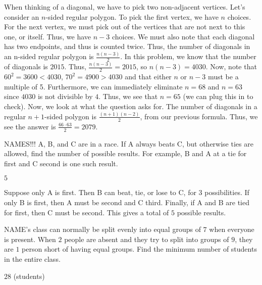 \documentclass[11pt]{article}
\begin{document}
\begin{solution}
When thinking of a diagonal, we have to pick two non-adjacent vertices. Let's consider an $n$-sided regular polygon. To pick the first vertex, we have $n$ choices. For the next vertex, we must pick out of the vertices that are not next to this one, or itself. Thus, we have $n-3$ choices. We must also note that each diagonal has two endpoints, and thus is counted twice. Thus, the number of diagonals in an n-sided regular polygon is $\frac{n(n-3)}{2}$. In this problem, we know that the number of diagonals is $2015$. Thus, $\frac{n(n-3)}{2} = 2015$, so $n(n-3) = 4030$. Now, note that $60^2 = 3600 < 4030$, $70^2 = 4900 > 4030$ and that either $n$ or $n-3$ must be a multiple of 5. Furthermore, we can immediately eliminate $n = 68$ and $n = 63$ since $4030$ is not divisible by $4$. Thus, we see that $n = 65$ (we can plug this in to check). Now, we look at what the question asks for. The number of diagonals in a regular $n+1$-sided polygon is $\frac{(n+1)(n-2)}{2}$, from our previous formula. Thus, we see the answer is $\frac{66 \cdot 63}{2} = 2079$.
\end{solution}


\begin{problem}
NAMES!!! A, B, and C are in a race. If A always beats C, but otherwise ties are allowed, find the number of possible results. For example, B and A at a tie for first and C second is one such result.
\end{problem}

\begin{answer}
$\boxed{5}$
\end{answer}

\begin{solution}
Suppose only A is first. Then B can beat, tie, or lose to C, for $3$ possibilities. If only B is first, then A must be second and C third. Finally, if A and B are tied for first, then C must be second. This gives a total of $\boxed{5}$ possible results.
\end{solution}


\begin{problem}
NAME's class can normally be split evenly into equal groups of $7$ when everyone is present. When $2$ people are absent and they try to split into groups of $9$, they are $1$ person short of having equal groups. Find the minimum number of students in the entire class.
\end{problem}

\begin{answer}
$\boxed{28}$ (students)
\end{answer}
\end{document}

